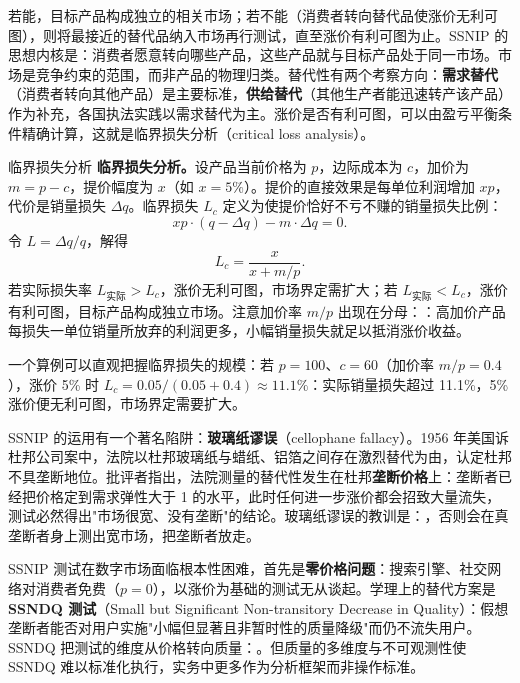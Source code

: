 若能，目标产品构成独立的相关市场；若不能（消费者转向替代品使涨价无利可图），则将最接近的替代品纳入市场再行测试，直至涨价有利可图为止。SSNIP 的思想内核是：消费者愿意转向哪些产品，这些产品就与目标产品处于同一市场。市场是竞争约束的范围，而非产品的物理归类。替代性有两个考察方向：\textbf{需求替代}（消费者转向其他产品）是主要标准，\textbf{供给替代}（其他生产者能迅速转产该产品）作为补充，各国执法实践以需求替代为主。涨价是否有利可图，可以由盈亏平衡条件精确计算，这就是临界损失分析（critical loss analysis）。

\begin{derivation}{临界损失分析}{}
\textbf{临界损失分析。}设产品当前价格为 $p$，边际成本为 $c$，加价为 $m = p - c$，提价幅度为 $x$（如 $x = 5\%$）。提价的直接效果是每单位利润增加 $xp$，代价是销量损失 $\Delta q$。临界损失 $L_c$ 定义为使提价恰好不亏不赚的销量损失比例：
\[
xp \cdot (q - \Delta q) - m \cdot \Delta q = 0.
\]
令 $L = \Delta q / q$，解得
\[
L_c = \frac{x}{x + m/p}.
\]
若实际损失率 $L_{\text{实际}} > L_c$，涨价无利可图，市场界定需扩大；若 $L_{\text{实际}} < L_c$，涨价有利可图，目标产品构成独立市场。注意加价率 $m/p$ 出现在分母：：高加价产品每损失一单位销量所放弃的利润更多，小幅销量损失就足以抵消涨价收益。
\end{derivation}

一个算例可以直观把握临界损失的规模：若 $p = 100$、$c = 60$（加价率 $m/p = 0.4$），涨价 5\% 时 $L_c = 0.05/(0.05 + 0.4) \approx 11.1\%$：实际销量损失超过 11.1\%，5\% 涨价便无利可图，市场界定需要扩大。

SSNIP 的运用有一个著名陷阱：\textbf{玻璃纸谬误}（cellophane fallacy）。1956 年美国诉杜邦公司案中，法院以杜邦玻璃纸与蜡纸、铝箔之间存在激烈替代为由，认定杜邦不具垄断地位。批评者指出，法院测量的替代性发生在杜邦\textbf{垄断价格}上：垄断者已经把价格定到需求弹性大于 1 的水平，此时任何进一步涨价都会招致大量流失，测试必然得出"市场很宽、没有垄断"的结论。玻璃纸谬误的教训是：，否则会在真垄断者身上测出宽市场，把垄断者放走。

SSNIP 测试在数字市场面临根本性困难，首先是\textbf{零价格问题}：搜索引擎、社交网络对消费者免费（$p = 0$），以涨价为基础的测试无从谈起。学理上的替代方案是\textbf{SSNDQ 测试}（Small but Significant Non-transitory Decrease in Quality）：假想垄断者能否对用户实施"小幅但显著且非暂时性的质量降级"而仍不流失用户。SSNDQ 把测试的维度从价格转向质量：。但质量的多维度与不可观测性使 SSNDQ 难以标准化执行，实务中更多作为分析框架而非操作标准。

